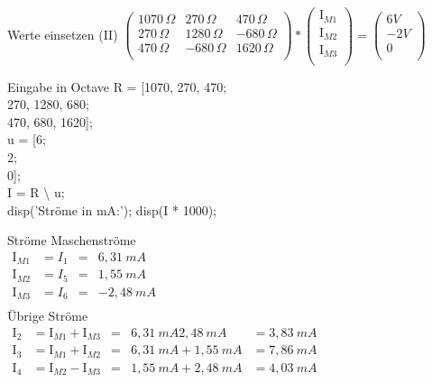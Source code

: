 \documentclass[aspectratio=169, ignorenonframetext]{beamer}
\begin{document}
\begin{frame}{Werte einsetzen (II)}
$\left( \begin{array}{ccc}
1070\,\Omega & 270\,\Omega& 470\,\Omega\\
270\,\Omega & 1280\,\Omega & -680\,\Omega\\
470\,\Omega &-680\,\Omega&1620\,\Omega \\
\end{array}\right) *
\left(\begin{array}{c}
  \text{I}_{M1}\\
  \text{I}_{M2}\\
  \text{I}_{M3}\\
     \end{array} \right)
     =
\left(\begin{array}{c}
  6V\\
  -2V\\
  0\\
     \end{array} \right)
$
\end{frame}

\begin{frame}{Eingabe in Octave}
 R = [1070, 270, 470;\\
     270, 1280, 680;\\
     470, 680, 1620];\\[\baselineskip]
u = [6;\\
     2;\\
     0];\\[\baselineskip]
I = R \textbackslash{} u;\\[\baselineskip]
disp('Ströme in mA:');
disp(I * 1000);
\end{frame}

\begin{frame}{Ströme}
  Maschenströme\\
 $\begin{array}{llcr}
  \text{I}_{M1} &= I_1 &=& 6,31\ mA\\
  \text{I}_{M2} &= I_5 &=& 1,55\ mA\\
  \text{I}_{M3} &= I_6 &=& -2,48\ mA\\
 \end{array}$
\pause
 \\[\baselineskip]Übrige Ströme\\
 $\begin{array}{llcrr}
   \text{I}_{2} &= \text{I}_{M1} + \text{I}_{M3} & = & 6,31\ mA 2,48\ mA & = 3,83\ mA\\
  \text{I}_{3} &= \text{I}_{M1} + \text{I}_{M2} &=& 6,31\ mA + 1,55\ mA &= 7,86\ mA\\
  \text{I}_{4} &=\text{I}_{M2} - \text{I}_{M3} &=& 1,55\ mA + 2,48\ mA &= 4,03\ mA
 \end{array}$
\end{frame}
\end{document}
